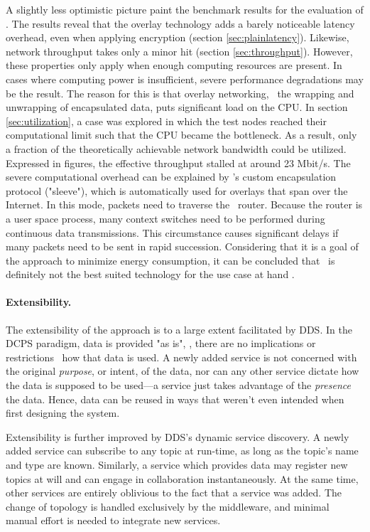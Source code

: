 A slightly less optimistic picture paint the benchmark results for the evaluation of \wnet . The results reveal that the overlay technology adds a barely noticeable latency overhead, even when applying encryption (\cf section \ref{sec:plainlatency}). Likewise, network throughput takes only a minor hit (\cf section \ref{sec:throughput}). However, these properties only apply when enough computing resources are present. In cases where computing power is insufficient, severe performance degradations may be the result. The reason for this is that overlay networking, \ie\ the wrapping and unwrapping of encapsulated data, puts significant load on the CPU. In section \ref{sec:utilization}, a case was explored in which the test nodes reached their computational limit such that the CPU became the bottleneck. As a result, only a fraction of the theoretically achievable network bandwidth could be utilized. Expressed in figures, the effective throughput stalled at around 23 Mbit/s. The severe computational overhead can be explained by \weave 's custom encapsulation protocol ("sleeve"), which is automatically used for overlays that span over the Internet. In this mode, packets need to traverse the \weave\ router. Because the router is a user space process, many context switches need to be performed during continuous data transmissions. This circumstance causes significant delays if many packets need to be sent in rapid succession. Considering that it is a goal of the approach to minimize energy consumption, it can be concluded that \wnet\ is definitely not the best suited technology for the use case at hand .

\paragraph{Extensibility.}
The extensibility of the approach is to a large extent facilitated by DDS. In the DCPS paradigm, data is provided "as is", \ie , there are no implications or restrictions \wrt\ how that data is used. A newly added service is not concerned with the original \emph{purpose}, or intent, of the data, nor can any other service dictate how the data is supposed to be used---a service just takes advantage of the \emph{presence} the data. Hence, data can be reused in ways that weren't even intended when first designing the system.

Extensibility is further improved by DDS's dynamic service discovery. A newly added service can subscribe to any topic at run-time, as long as the topic's name and type are known. Similarly, a service which provides data may register new topics at will and can engage in collaboration instantaneously. At the same time, other services are entirely oblivious to the fact that a service was added. The change of topology is handled exclusively by the middleware, and minimal manual effort is needed to integrate new services.

